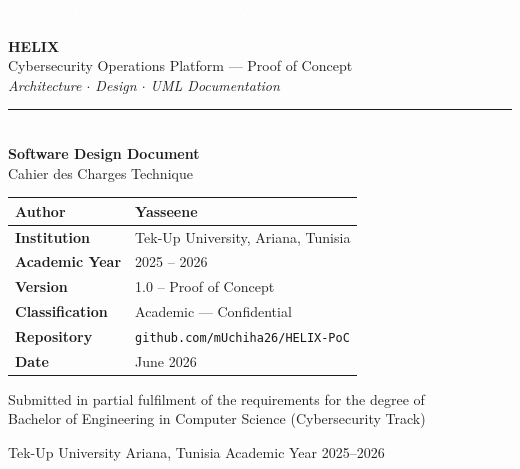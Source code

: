 \documentclass[12pt,a4paper]{article}
\begin{document}

\begin{titlepage}
	\thispagestyle{empty}
	\noindent\colorbox{helixpurple}{%
		\parbox{\dimexpr\textwidth+2\fboxsep\relax}{%
			\vspace{10pt}
			\hspace{8pt}\textcolor{white}{\small\scshape{Software Design Document --- PoC Version}}%
			\vspace{10pt}
		}%
	}
	\vspace{2cm}
	\begin{center}
		{\fontsize{52}{60}\selectfont\bfseries\color{helixpurple} HELIX}\\[10pt]
		{\Large\color{textsecondary}Cybersecurity Operations Platform --- Proof of Concept}\\[8pt]
		{\normalsize\color{helixpurplemid}\textit{Architecture $\cdot$ Design $\cdot$ UML Documentation}}\\[20pt]
		\color{helixborder}\rule{0.65\textwidth}{0.5pt}\\[25pt]
		{\fontsize{22}{28}\selectfont\bfseries\color{helixpurple} Software Design Document}\\[4pt]
		{\large\color{helixpurplemid}Cahier des Charges Technique}
	\end{center}
	\vspace{1.5cm}
	\begin{center}
		\begin{tabular}{L{5.2cm} L{7.5cm}}
			\toprule
			\textbf{Author}         & Yasseene \\
			\midrule
			\textbf{Institution}    & Tek-Up University, Ariana, Tunisia \\
			\midrule
			\textbf{Academic Year}  & 2025 -- 2026 \\
			\midrule
			\textbf{Version}        & 1.0 -- Proof of Concept \\
			\midrule
			\textbf{Classification} & Academic --- Confidential \\
			\midrule
			\textbf{Repository}     & \texttt{github.com/mUchiha26/HELIX-PoC} \\
			\midrule
			\textbf{Date}           & June 2026 \\
			\bottomrule
		\end{tabular}
	\end{center}
	\vfill
	\begin{center}
		{\small Submitted in partial fulfilment of the requirements for the degree of\\
		Bachelor of Engineering in Computer Science (Cybersecurity Track)}
	\end{center}
	\vfill
	\noindent\colorbox{helixgraylight}{%
		\parbox{\dimexpr\textwidth+2\fboxsep\relax}{%
			\vspace{8pt}
			\hspace{8pt}\small\color{textsecondary}%
			Tek-Up University \hfill Ariana, Tunisia \hfill Academic Year 2025--2026
			\vspace{8pt}
		}%
	}
\end{titlepage}
\clearpage
{}
\end{document}

